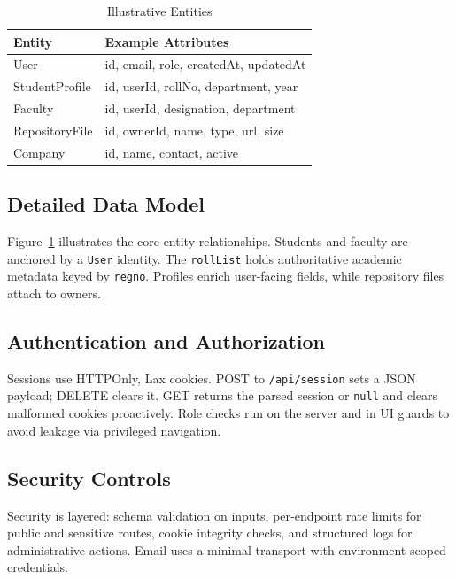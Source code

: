 \documentclass[conference]{IEEEtran}
\begin{document}
\begin{table}[t]
\centering
\caption{Illustrative Entities}
\label{tab:entities}
\begin{tabular}{p{2.9cm}p{5.0cm}}
\toprule
\textbf{Entity} & \textbf{Example Attributes} \\
\midrule
User & id, email, role, createdAt, updatedAt \\
StudentProfile & id, userId, rollNo, department, year \\
Faculty & id, userId, designation, department \\
RepositoryFile & id, ownerId, name, type, url, size \\
Company & id, name, contact, active \\
\bottomrule
\end{tabular}
\end{table}

\subsection{Detailed Data Model}
Figure~\ref{fig:er} illustrates the core entity relationships. Students and faculty are anchored by a \texttt{User} identity. The \texttt{rollList} holds authoritative academic metadata keyed by \texttt{regno}. Profiles enrich user-facing fields, while repository files attach to owners.

\begin{figure}[t]
  \centering

 
  \label{fig:er}
\end{figure}

\subsection{Authentication and Authorization}
Sessions use HTTPOnly, Lax cookies. POST to \texttt{/api/session} sets a JSON payload; DELETE clears it. GET returns the parsed session or \texttt{null} and clears malformed cookies proactively. Role checks run on the server and in UI guards to avoid leakage via privileged navigation.

\subsection{Security Controls}
Security is layered: schema validation on inputs, per‑endpoint rate limits for public and sensitive routes, cookie integrity checks, and structured logs for administrative actions. Email uses a minimal transport with environment‑scoped credentials.
\end{document}
